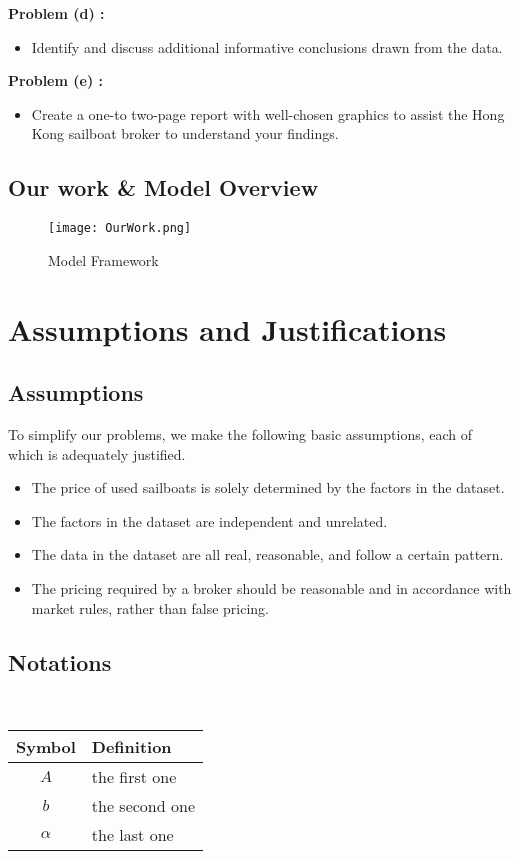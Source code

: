 \documentclass[12pt]{article}  %
\begin{document}
\textbf{Problem (d) :}
\begin{itemize}
    \item Identify and discuss additional informative conclusions drawn from the data.
\end{itemize}

\textbf{Problem (e) :}
\begin{itemize}
    \item Create a one-to two-page report with well-chosen graphics to assist the Hong Kong sailboat broker to understand your findings.
\end{itemize}
\subsection{Our work \& Model Overview}
\begin{figure}[htbp]
    \centering
    \texttt{[image: OurWork.png]}
    \caption{Model Framework}\label{fig:OurWork}
\end{figure}


\section{Assumptions and Justifications}
\subsection{Assumptions}
To simplify our problems, we make the following basic assumptions, each of which is
adequately justified.
\begin{itemize}
    \item The price of used sailboats is solely determined by the factors in the dataset.
    \item The factors in the dataset are independent and unrelated.
    \item The data in the dataset are all real, reasonable, and follow a certain pattern.
    \item The pricing required by a broker should be reasonable and in accordance with market rules, rather than false pricing.
\end{itemize}
\subsection{Notations}
\ 
\begin{table}[!htbp]
\begin{center}
\begin{tabular}{cl}
	\toprule
	\multicolumn{1}{m{3cm}}{\centering Symbol}
	&\multicolumn{1}{m{8cm}}{\centering Definition}\\
	\midrule
	$A$&the first one\\
	$b$&the second one\\
	$\alpha$ &the last one\\
	\bottomrule
\end{tabular}
\end{center}
\end{table}
\end{document}
